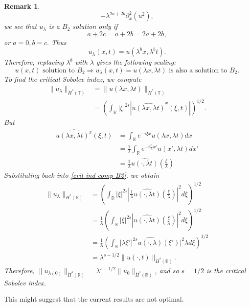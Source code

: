 \documentclass[12pt,reqno]{amsart}
\numberwithin{equation}{section}  %
\newcommand{\rr}{\mathbb{R}}
\newcommand{\ci}{\mathbb{T}}
\newcommand{\wh}{\widehat}
\newtheorem{remark}[theorem]{Remark}
\begin{document}
\begin{appendices}
\begin{itemize}
\begin{framed}
\begin{remark}
$$ +
  \lambda^{2a+2b}
  \partial_x^2(u^2),  
$$
we see that $u_\lambda$ is a $B_2$ solution only if
$$
a+2c=a+2b=2a+2b,
$$
or
$
a=0, b=c.
$
  Thus
\[
u_\lambda (x, t) = u(\lambda^{b}x,  \lambda^{b} t).
\]
%
%
Therefore, replacing  $ \lambda^b$ with  $ \lambda$ gives the following scaling:
%
\begin{equation}
\label{B2-scal}
\boxed{
u(x, t) \text{ solution to }  B_2
 \Longrightarrow 
u_\lambda (x, t) = u(\lambda x, \lambda t)  \text { is also a
solution to }  B_2. 
}
\end{equation}
\label{rem:scaling-B2}
To find the critical Sobolev index, we compute
\\
%
%
\begin{equation}
\begin{split}
  \| u_{\lambda} \|_{\dot{H}^s(\ci)} 
  & =  \| u(\lambda x, \lambda t) \|_{\dot{H}^{s}(\ci)}
  \\
  & = \left( \int_{\rr} | \xi |^{2s} | \wh{u(\lambda x,
  \lambda t)}^x (\xi, t)| \right)^{1/2}.
\end{split}
\label{crit-ind-comp-B2}
\end{equation}
%
But
%
\\
%
\begin{equation*}
\begin{split}
  \wh{u(\lambda x, \lambda t)^x}(\xi, t)
  & = \int_{\rr}e^{-i\xi x}u(\lambda x, \lambda t) dx
  \\
  & = \frac{1}{\lambda} \int_{\rr}e^{-i \frac{n}{\lambda} x'}u(x',
  \lambda t) dx'
  \\
  & = \frac{1}{\lambda} \wh{u(\cdot, \lambda t)}(\frac{\xi}{\lambda})
\end{split}
\end{equation*}
%
%
Substituting back into \eqref{crit-ind-comp-B2}, we obtain
%
%
\begin{equation*}
\begin{split}
  \| u_{\lambda} \|_{\dot{H}^s(\rr)} 
  & = \left( \int_{\rr} | \xi |^{2s} |
  \frac{1}{\lambda}\wh{u(\cdot, \lambda t)}(\frac{\xi}{\lambda}) |^2 d \xi
  \right)^{1/2}
  \\
  & = \frac{1}{\lambda} \left( \int_{\rr}| \xi |^{2s} | \wh{u(\cdot,
  \lambda t)}(\frac{\xi}{\lambda}) |^2 d \xi  \right)^{1/2}
  \\
  & = \frac{1}{\lambda} \left( \int_{\rr} | \lambda \xi' |^{2s} 
  \wh{u(\cdot, \lambda)}(\xi') |^2 \lambda d \xi
  \right)^{1/2}
  \\
  & = \lambda^{s - 1/2} \|u(\cdot, t) \|_{\dot{H}^s (\rr)}.
\end{split}
\end{equation*}
%
%
Therefore, $\| u_{\lambda(0)} \|_{\dot{H}^s(\rr)} = \lambda^{s - 1/2} \|
u_{0} \|_{\dot{H}^{s}(\rr)}$, and so $s=1/2$ is the critical Sobolev index.
\end{remark}
\end{framed}
\end{itemize}
This might suggest that the current results are not optimal.
\end{appendices}
\end{document}
